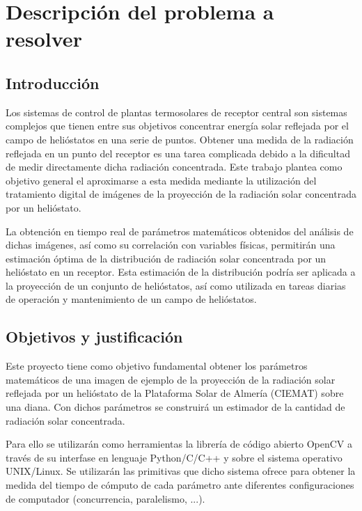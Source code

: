 \chapter{Descripci\'on del problema a resolver}

\section{Introducción}

Los sistemas de control de plantas termosolares de receptor central son sistemas complejos que tienen entre sus objetivos concentrar energía solar reflejada por el campo de helióstatos en una serie de puntos. Obtener una medida de la radiación reflejada en un punto del receptor es una tarea complicada debido a la dificultad de medir directamente dicha radiación concentrada. Este trabajo plantea como objetivo general el aproximarse a esta medida mediante la utilización del tratamiento digital de imágenes de la proyección de la radiación solar concentrada por un helióstato.

La obtención en tiempo real de parámetros matemáticos obtenidos del análisis de dichas imágenes, así como su correlación con variables físicas, permitirán una estimación óptima de la distribución de radiación solar concentrada por un helióstato en un receptor. Esta estimación de la distribución podría ser aplicada a la proyección de un conjunto de helióstatos, así como utilizada en tareas diarias de operación y mantenimiento de un campo de helióstatos.

\section{Objetivos y justificación}

Este proyecto tiene como objetivo fundamental obtener los parámetros matemáticos de una imagen de ejemplo de la proyección de la radiación solar reflejada por un helióstato de la Plataforma Solar de Almería (CIEMAT) sobre una diana. Con dichos parámetros se construirá un estimador de la cantidad de radiación solar concentrada.

Para ello se utilizarán como herramientas la librería de código abierto OpenCV a través de su interfase en lenguaje Python/C/C++ y sobre el sistema operativo UNIX/Linux. Se utilizarán las primitivas que dicho sistema ofrece para obtener la medida del tiempo de cómputo de cada parámetro ante diferentes configuraciones de computador (concurrencia, paralelismo, ...). \cite{OpenCVWebSite} \cite{SALWebSite} \cite{IEEEXploreWebSite}

